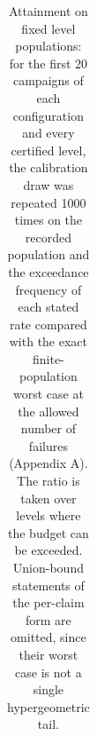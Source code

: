 \documentclass{iopjournal}
\begin{document}
{\renewcommand{\thetable}{S5.2}\small
\begin{longtable}[]{@{}
  >{\raggedright\arraybackslash}p{}
  >{\raggedright\arraybackslash}p{}
  >{\raggedright\arraybackslash}p{}
  >{\raggedright\arraybackslash}p{}
  >{\raggedright\arraybackslash}p{}
  >{\raggedright\arraybackslash}p{}
  >{\raggedright\arraybackslash}p{}@{}}
\caption{Attainment on fixed level populations: for the first 20 campaigns of each configuration and every certified level, the calibration draw was repeated 1000 times on the recorded population and the exceedance frequency of each stated rate compared with the exact finite-population worst case at the allowed number of failures (Appendix A). The ratio is taken over levels where the budget can be exceeded. Union-bound statements of the per-claim form are omitted, since their worst case is not a single hypergeometric tail.}\label{tab:S5.2}\\


\end{longtable}}
\end{document}
